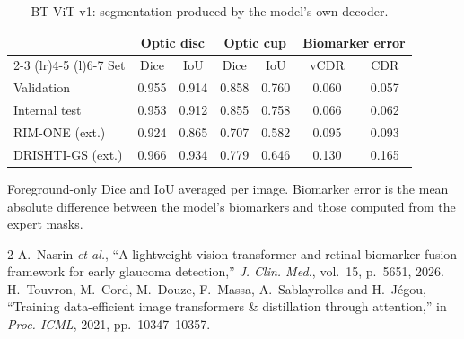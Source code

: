 \documentclass[10pt]{article}
\begin{document}
\begin{table}[h]
\centering
\begin{threeparttable}
\caption{BT-ViT v1: segmentation produced by the model's own decoder.}
\label{tab:v1seg}
\small
\begin{tabular}{@{}lcccccc@{}}
\toprule
 & \multicolumn{2}{c}{Optic disc} & \multicolumn{2}{c}{Optic cup} & \multicolumn{2}{c}{Biomarker error} \\
\cmidrule(lr){2-3} \cmidrule(lr){4-5} \cmidrule(l){6-7}
Set & Dice & IoU & Dice & IoU & vCDR & CDR \\
\midrule
Validation & 0.955 & 0.914 & 0.858 & 0.760 & 0.060 & 0.057 \\
Internal test & 0.953 & 0.912 & 0.855 & 0.758 & 0.066 & 0.062 \\
RIM-ONE (ext.) & 0.924 & 0.865 & 0.707 & 0.582 & 0.095 & 0.093 \\
DRISHTI-GS (ext.) & 0.966 & 0.934 & 0.779 & 0.646 & 0.130 & 0.165 \\
\bottomrule
\end{tabular}
\begin{tablenotes}\footnotesize
\item[] Foreground-only Dice and IoU averaged per image. Biomarker error is the mean absolute difference
between the model's biomarkers and those computed from the expert masks.
\end{tablenotes}
\end{threeparttable}
\end{table}

\begin{thebibliography}{2}\footnotesize
{} A.~Nasrin \emph{et al.}, ``A lightweight vision transformer and retinal biomarker fusion
framework for early glaucoma detection,'' \emph{J. Clin. Med.}, vol.~15, p.~5651, 2026.
 H.~Touvron, M.~Cord, M.~Douze, F.~Massa, A.~Sablayrolles and H.~J\'egou,
``Training data-efficient image transformers \& distillation through attention,'' in \emph{Proc. ICML},
2021, pp.~10347--10357.
\end{thebibliography}
\end{document}
